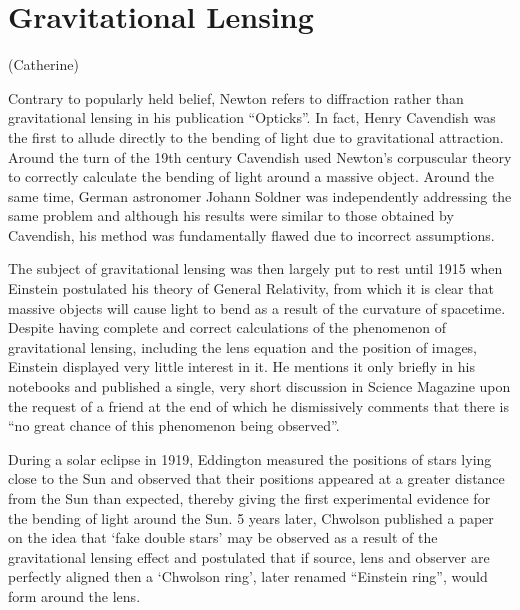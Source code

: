 
\newpage
\section{Gravitational Lensing} %
\label{sec:gravitational_lensing}

(Catherine)

		Contrary to popularly held belief, Newton refers to diffraction rather than gravitational lensing in his publication ``Opticks''\cite{Newton_Opticks}. In fact, Henry Cavendish was the first to allude directly to the bending of light due to gravitational attraction. Around the turn of the 19th century Cavendish used Newton's corpuscular theory to correctly calculate the bending of light around a massive object.  Around the same time, German astronomer Johann Soldner was independently addressing the same problem\cite{Soldner} and although his results were similar to those obtained by Cavendish, his method was fundamentally flawed due to incorrect assumptions\cite{Conceptual_origins_of_GL}.

		The subject of gravitational lensing was then largely put to rest until 1915 when Einstein postulated his theory of General Relativity, from which it is clear that massive objects will cause light to bend as a result of the curvature of spacetime. Despite having complete and correct calculations of the phenomenon of gravitational lensing, including the lens equation and the position of images, Einstein displayed very little interest in it. He mentions it only briefly in his notebooks and published a single, very short discussion in Science Magazine upon the request of a friend at the end of which he dismissively comments that there is ``no great chance of this phenomenon being observed''\cite{Einstein_science_magazine}.

		During a solar eclipse in 1919, Eddington measured the positions of stars lying close to the Sun and observed that their positions appeared at a greater distance from the Sun than expected, thereby giving the first experimental evidence for the bending of light around the Sun\cite{Eddington_GL_evidence}. 5 years later, Chwolson published a paper on the idea that `fake double stars' may be observed as a result of the gravitational lensing effect and postulated that if source, lens and observer are perfectly aligned then a `Chwolson ring', later renamed ``Einstein ring'', would form around the lens\cite{Conceptual_origins_of_GL}.

